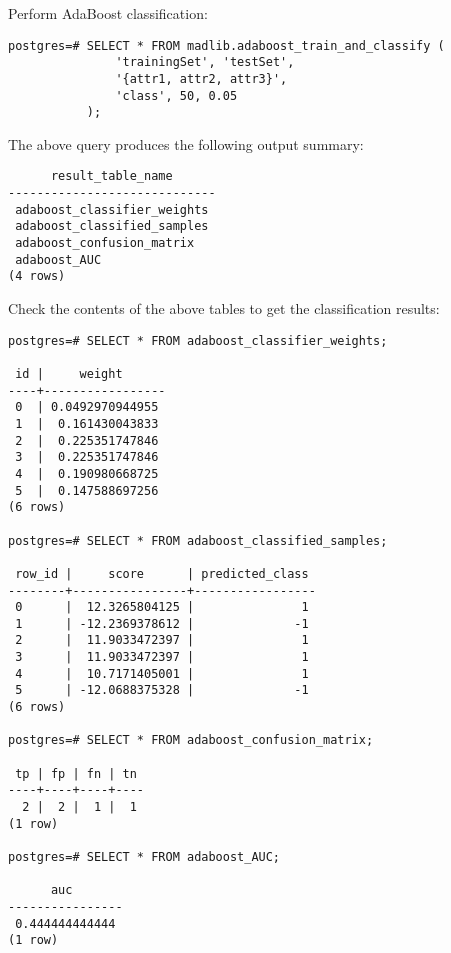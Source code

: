 {\raggedleft Perform AdaBoost classification:}

\begin{verbatim}
postgres=# SELECT * FROM madlib.adaboost_train_and_classify (
               'trainingSet', 'testSet', 
               '{attr1, attr2, attr3}', 
               'class', 50, 0.05
           );
\end{verbatim}

{\raggedleft The above query produces the following output summary:}

\begin{verbatim}
      result_table_name      
-----------------------------
 adaboost_classifier_weights
 adaboost_classified_samples
 adaboost_confusion_matrix
 adaboost_AUC
(4 rows)
\end{verbatim}

{\raggedleft Check the contents of the above tables to get the classification results:}

\begin{verbatim}
postgres=# SELECT * FROM adaboost_classifier_weights;

 id |     weight      
----+-----------------
 0  | 0.0492970944955
 1  |  0.161430043833
 2  |  0.225351747846
 3  |  0.225351747846
 4  |  0.190980668725
 5  |  0.147588697256
(6 rows)

postgres=# SELECT * FROM adaboost_classified_samples;

 row_id |     score      | predicted_class 
--------+----------------+-----------------
 0      |  12.3265804125 |               1
 1      | -12.2369378612 |              -1
 2      |  11.9033472397 |               1
 3      |  11.9033472397 |               1
 4      |  10.7171405001 |               1
 5      | -12.0688375328 |              -1
(6 rows)

postgres=# SELECT * FROM adaboost_confusion_matrix;

 tp | fp | fn | tn 
----+----+----+----
  2 |  2 |  1 |  1
(1 row)

postgres=# SELECT * FROM adaboost_AUC;

      auc       
----------------
 0.444444444444
(1 row)

\end{verbatim}




